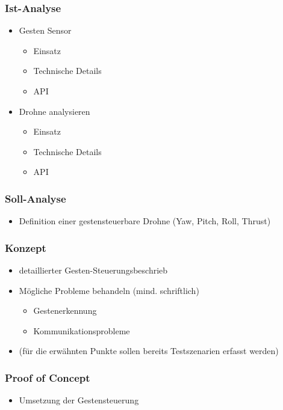 \subsubsection{Ist-Analyse}
\begin{itemize}
	\item Gesten Sensor
	\begin{itemize}
		\item Einsatz
		\item Technische Details
		\item API
	\end{itemize}

	\item Drohne analysieren
	\begin{itemize}
		\item Einsatz
		\item Technische Details
		\item API
	\end{itemize}
\end{itemize}


\subsubsection{Soll-Analyse}
\begin{itemize}
	\item Definition einer gestensteuerbare Drohne (Yaw, Pitch, Roll, Thrust)
\end{itemize}


\subsubsection{Konzept}
\begin{itemize}
	\item detaillierter Gesten-Steuerungsbeschrieb
	\item Mögliche Probleme behandeln (mind. schriftlich)
	\begin{itemize}
		\item Gestenerkennung
		\item Kommunikationsprobleme
	\end{itemize}
	\item (für die erwähnten Punkte sollen bereits Testszenarien erfasst werden)
\end{itemize}


\subsubsection{Proof of Concept}
\begin{itemize}
	\item Umsetzung der Gestensteuerung
\end{itemize}



